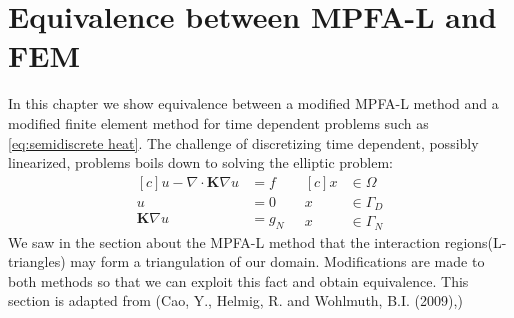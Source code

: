 \documentclass[../Main/main.tex]{subfiles}
\begin{document}
	\chapter{Equivalence between MPFA-L and FEM}
	\graphicspath{{../Equivalence between MPFA-L and FEM/figs/}}
	In this chapter we show equivalence between a modified MPFA-L method and a modified finite element method for time dependent problems such as  \eqref{eq:semidiscrete heat}. The challenge of discretizing time dependent, possibly linearized, problems boils down to solving the elliptic problem:
	\begin{equation}\label{eq:stationary_heat}
		\begin{aligned}[c]
		u - \nabla \cdot \pmb{K} \nabla u &= f \\
			u &= 0 \\
			\pmb{K}\nabla u &= g_N
		\end{aligned}
		\ \ \
		\begin{aligned}[c]
			x &\in \Omega  \\
			x &\in  \Gamma_D \\
			x &\in \Gamma_N 
		\end{aligned}
	\end{equation}
	We saw in the section about the MPFA-L method that the interaction regions(L-triangles) may form a triangulation of our domain.
	Modifications are made to both methods so that we can exploit this fact and obtain equivalence. This section is adapted from (Cao, Y., Helmig, R. and Wohlmuth, B.I. (2009),\cite{https://doi.org/10.1002/num.20525})
\end{document}
